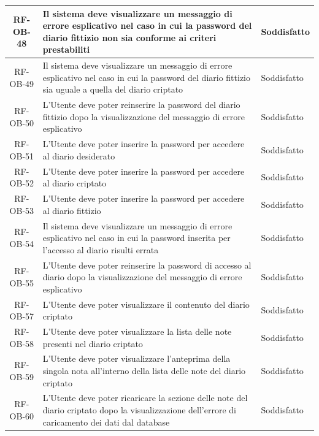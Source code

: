 \documentclass[a4paper,12pt]{article}
\begin{document}
\begin{center}
\begin{longtable}{|c|p{8.5cm}|>{\centering\arraybackslash}p{4cm}|}
RF-OB-48 & Il sistema deve visualizzare un messaggio di errore esplicativo nel caso in cui la password del diario fittizio non sia conforme ai criteri prestabiliti & Soddisfatto \\
\hline

RF-OB-49 & Il sistema deve visualizzare un messaggio di errore esplicativo nel caso in cui la password del diario fittizio sia uguale a quella del diario criptato & Soddisfatto \\
\hline

RF-OB-50 & L'Utente deve poter reinserire la password del diario fittizio dopo la visualizzazione del messaggio di errore esplicativo & Soddisfatto \\
\hline

RF-OB-51 & L'Utente deve poter inserire la password per accedere al diario desiderato & Soddisfatto \\
\hline

RF-OB-52 & L'Utente deve poter inserire la password per accedere al diario criptato & Soddisfatto \\
\hline

RF-OB-53 & L'Utente deve poter inserire la password per accedere al diario fittizio & Soddisfatto \\
\hline

RF-OB-54 & Il sistema deve visualizzare un messaggio di errore esplicativo nel caso in cui la password inserita per l'accesso al diario risulti errata & Soddisfatto \\
\hline

RF-OB-55 & L'Utente deve poter reinserire la password di accesso al diario dopo la visualizzazione del messaggio di errore esplicativo & Soddisfatto \\
\hline

RF-OB-57 & L'Utente deve poter visualizzare il contenuto del diario criptato & Soddisfatto \\
\hline

RF-OB-58 & L'Utente deve poter visualizzare la lista delle note presenti nel diario criptato & Soddisfatto \\
\hline

RF-OB-59 & L'Utente deve poter visualizzare l'anteprima della singola nota all'interno della lista delle note del diario criptato & Soddisfatto \\
\hline

RF-OB-60 & L'Utente deve poter ricaricare la sezione delle note del diario criptato dopo la visualizzazione dell'errore di caricamento dei dati dal database & Soddisfatto \\
\hline


\end{longtable}
\end{center}
\end{document}
